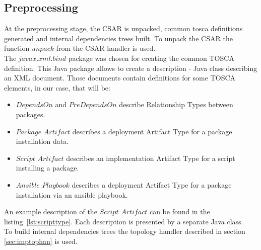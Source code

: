 \subsection*{Preprocessing}
At the preprocessing stage, the CSAR is unpacked, common \gls{tosca} definitions generated and internal dependencies trees built. 
%
To unpack the CSAR the function $unpack$ from the CSAR handler is used.\\
%
The $javax$.$xml$.$bind$ package was chosen for creating the common TOSCA definition. 
This Java package allows to create a description - Java class describing an XML document. 
Those documents contain definitions for some TOSCA elements, in our case, that will be:
\begin{itemize}
	\item $DependsOn$ and $PreDependsOn$ describe Relationship Types %
	  between packages.%
	\item $Package$ $Artifact$ describes a deployment Artifact Type for a package installation data.
	\item $Script$ $Artifact$ describes an implementation Artifact Type for a script installing a package.
	\item $Ansible$ $Playbook$ describes a deployment Artifact Type for a package installation via an ansible playbook.
\end{itemize}
An example description of the $Script$ $Artifact$ can be found in the listing~\ref{lst:scripttype}.
Each description is presented by a separate Java class.\\
%
To build internal dependencies trees the topology handler described in section \ref{sec:imptophan} is used. 

